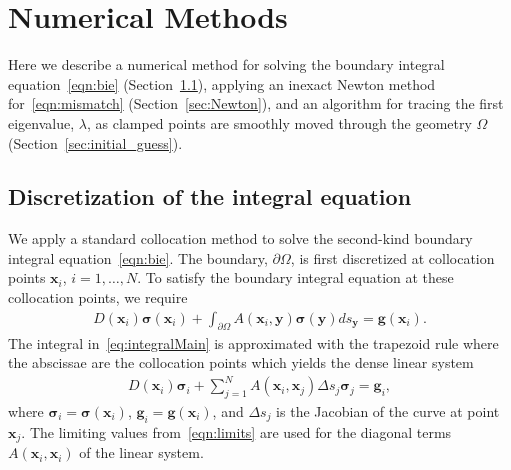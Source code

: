 \documentclass[times]{article}
\newcommand{\bd}{\partial}
\renewcommand{\gg}{\mathbf{g}}
\newcommand{\ssigma}{\boldsymbol{\sigma}}
\newcommand{\xx}{\mathbf{x}}
\newcommand{\yy}{\mathbf{y}}
\begin{document}
\section{Numerical Methods}
\label{sec:algorithms}
Here we describe a numerical method for solving the boundary integral
equation~\eqref{eqn:bie} (Section~\ref{sec:bie_dis}), applying an
inexact Newton method for~\eqref{eqn:mismatch}
(Section~\ref{sec:Newton}), and an algorithm for tracing the first
eigenvalue, $\lambda$, as clamped points are smoothly moved through the
geometry $\Omega$ (Section~\ref{sec:initial_guess}). 

\subsection{Discretization of the integral equation}
\label{sec:bie_dis}
We apply a standard collocation method to solve the second-kind boundary
integral equation~\eqref{eqn:bie}.  The boundary, $\bd\Omega$, is first
discretized at collocation points $\xx_{i}$,
$i=1,\ldots,N$.  To satisfy the boundary integral equation at these
collocation points, we require
\begin{align}\label{eq:integralMain}
  D(\xx_i)\ssigma(\xx_i) + \int_{\bd\Omega} A(\xx_i,\yy)\ssigma(\yy) ds_{\yy}
    =\gg(\xx_i).
\end{align}
The integral in~\eqref{eq:integralMain} is approximated with the
trapezoid rule where the abscissae are the collocation points which
yields the dense linear system
\begin{align*}
  D(\xx_{i}) \ssigma_i + \sum_{j=1}^{N} A(\xx_{i},\xx_{j})\Delta s_{j}
    \ssigma_{j} = \gg_{i},
\end{align*}
where $\ssigma_i = \ssigma(\xx_{i})$, $\gg_{i} = \gg(\xx_{i})$, and
$\Delta s_{j}$ is the Jacobian of the curve at point $\xx_{j}$.  The
limiting values from~\eqref{eqn:limits} are used for the diagonal terms
$A(\xx_i,\xx_i)$ of the linear system.
\end{document}
